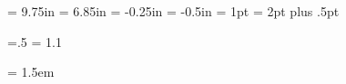 
\vsize            = 9.75in
\hsize            = 6.85in
\voffset          = -0.25in
\hoffset          = -0.5in
\lineskiplimit    = 1pt
\lineskip         = 2pt plus .5pt

\parindent=0pt
\baselineskip=13pt
\parskip=.5\baselineskip
\baselineskip = 1.1\baselineskip

\emergencystretch = 1.5em
